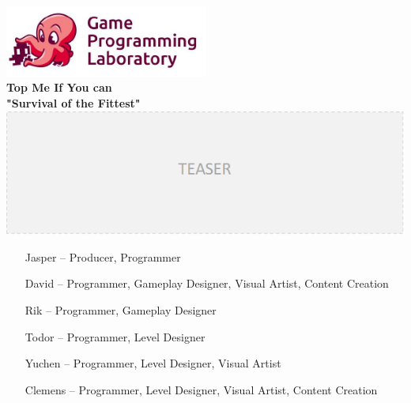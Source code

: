 \documentclass[a4paper,twoside,12pt,chapterprefix=false]{scrbook}
\begin{document}
\begin{titlepage}
	\oddsidemargin 0.0cm
	\evensidemargin 0.0cm
	
	\raggedleft \includegraphics*[width=0.5\textwidth]{figures/gpl_logo} \\
	
	\centering
	\Huge
	\vspace{2.0cm}
	\textbf{\textsf{Top Me If You can}} \\[1.0cm]
	\large
	\textbf{\textsf{"Survival of the Fittest"}} \\[1.0cm]
	\includegraphics*[width=1.0\textwidth]{figures/teaser_temp} \\ [2.0cm]
	
	\sffamily
	\raggedright
	\vfill
	
	\large
	
	
	\begin{itemize}
	    \item[Jasper --]
	     Producer, Programmer \\
	    \item[David --]
	     Programmer, Gameplay Designer, Visual Artist, Content Creation
	     \item[Rik --] 
	     Programmer, Gameplay Designer 
	     \item[Todor --]
	     Programmer, Level Designer 
	     \item[Yuchen --]
	     Programmer, Level Designer, Visual Artist
	     \item[Clemens --]
	     Programmer, Level Designer, Visual Artist, Content Creation
	\end{itemize}
	
\end{titlepage}
\clearemptydoublepage
\end{document}
